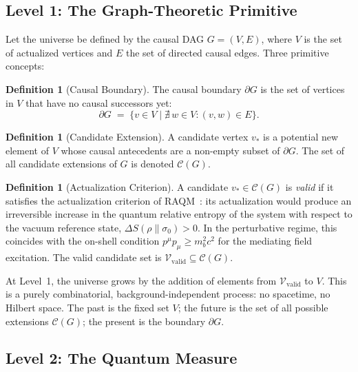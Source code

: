 \documentclass[11pt,a4paper]{article}
\theoremstyle{plain}
\theoremstyle{definition}
\newtheorem{definition}[theorem]{Definition}
\theoremstyle{remark}
\newcommand{\Vvalid}{\mathcal{V}_{\mathrm{valid}}}
\begin{document}
\subsection{Level 1: The Graph-Theoretic Primitive}

Let the universe be defined by the causal DAG $G = (V, E)$, where $V$ is the
set of actualized vertices and $E$ the set of directed causal edges. Three
primitive concepts:

\begin{definition}[Causal Boundary]
The causal boundary $\partial G$ is the set of vertices in $V$ that have no
causal successors yet:
\begin{equation}
  \partial G \;=\; \{v \in V \mid \nexists\, w \in V : (v,w) \in E\}.
  \label{eq:boundary_v2}
\end{equation}
\end{definition}

\begin{definition}[Candidate Extension]
A candidate vertex $v_*$ is a potential new element of $V$ whose causal
antecedents are a non-empty subset of $\partial G$. The set of all candidate
extensions of $G$ is denoted $\mathcal{C}(G)$.
\end{definition}

\begin{definition}[Actualization Criterion]
A candidate $v_* \in \mathcal{C}(G)$ is \emph{valid} if it satisfies the
actualization criterion of RAQM~\citep{Sandeman2026a}: its actualization would
produce an irreversible increase in the quantum relative entropy of the system
with respect to the vacuum reference state, $\Delta S(\rho\|\sigma_0) > 0$.
In the perturbative regime, this coincides with the on-shell condition
$p^\mu p_\mu \geq m_b^2 c^2$ for the mediating field excitation. The valid
candidate set is $\Vvalid \subseteq \mathcal{C}(G)$.
\end{definition}

At Level~1, the universe grows by the addition of elements from $\Vvalid$ to
$V$. This is a purely combinatorial, background-independent process: no
spacetime, no Hilbert space. The past is the fixed set $V$; the future is the
set of all possible extensions $\mathcal{C}(G)$; the present is the boundary
$\partial G$.

\subsection{Level 2: The Quantum Measure}
\end{document}
